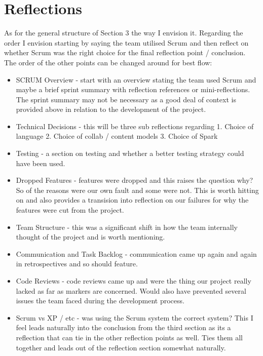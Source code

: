 \documentclass{l3proj}
\begin{document}
\section{Reflections}
\label{sec:reflections}


As for the general structure of Section 3 the way I envision it. Regarding the order I envision starting by saying the team utilised Scrum and then reflect on whether Scrum was the right choice for the final reflection point / conclusion. The order of the other points can be changed around for best flow:
\begin{itemize}
\item SCRUM Overview - start with an overview stating the team used Scrum and maybe a brief sprint summary with reflection references or mini-reflections. The sprint summary may not be necessary as a good deal of context is provided above in relation to the development of the project.
\item Technical Decisions - this will be three sub reflections regarding 1. Choice of language 2. Choice of collab / content models 3. Choice of Spark
\item Testing - a section on testing and whether a better testing strategy could have been used.
\item Dropped Features - features were dropped and this raises the question why? So of the reasons were our own fault and some were not. This is worth hitting on and also provides a transision into reflection on our failures for why the features were cut from the project.
\item Team Structure - this was a significant shift in how the team internally thought of the project and is worth mentioning.
\item Communication and Task Backlog - communication came up again and again in retrospectives and so should feature.
\item Code Reviews - code reviews came up and were the thing our project really lacked as far as markers are concerned. Would also have prevented several issues the team faced during the development process.
\item Scrum vs XP / etc - was using the Scrum system the correct system? This I feel leads naturally into the conclusion from the third section as its a reflection that can tie in the other reflection points as well. Ties them all together and leads out of the reflection section somewhat naturally.
\end{itemize} 
\end{document}
